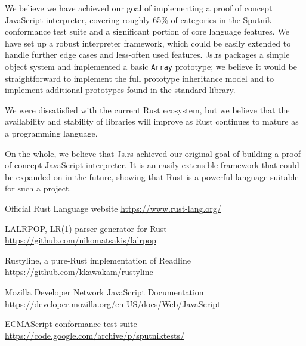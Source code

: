 \documentclass{article}
\begin{document}
\begin{multicols}{2}
We believe we have achieved our goal of implementing a proof of concept
JavaScript interpreter, covering roughly 65\% of categories in the Sputnik
conformance test suite and a significant portion of core language features. We
have set up a robust interpreter framework, which could be easily extended to
handle further edge cases and less-often used features. Js.rs packages a simple
object system and implemented a basic \texttt{Array} prototype; we believe it
would be straightforward to implement the full prototype inheritance model and
to implement additional prototypes found in the standard library. \newline

We were dissatisfied with the current Rust ecosystem, but we believe that the
availability and stability of libraries will improve as Rust continues to mature
as a programming language. \newline

On the whole, we believe that Js.rs achieved our original goal of building a
proof of concept JavaScript interpreter. It is an easily extensible framework
that could be expanded on in the future, showing that Rust is a powerful
language suitable for such a project.

\end{multicols}

\pagebreak

\begin{thebibliography}{9}
  Official Rust Language website
  \href{https://www.rust-lang.org/}{https://www.rust-lang.org/}

  LALRPOP, LR(1) parser generator for Rust
  \href{https://github.com/nikomatsakis/lalrpop}{https://github.com/nikomatsakis/lalrpop}

  Rustyline, a pure-Rust implementation of Readline\\
  \href{https://github.com/kkawakam/rustyline}{https://github.com/kkawakam/rustyline}

  Mozilla Developer Network JavaScript Documentation
  \href{https://developer.mozilla.org/en-US/docs/Web/JavaScript}{https://developer.mozilla.org/en-US/docs/Web/JavaScript}

  ECMAScript conformance test suite
  \href{https://code.google.com/archive/p/sputniktests/}{https://code.google.com/archive/p/sputniktests/}
\end{thebibliography}
\end{document}
